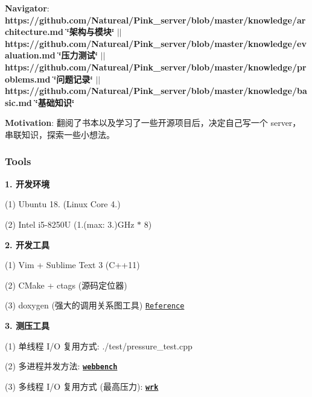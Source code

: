 {\bfseries Navigator}\+: {\bfseries https\+://github.com/\+Natureal/\+Pink\+\_\+server/blob/master/knowledge/architecture.\+md \char`\"{}架构与模块\char`\"{}} $\vert$$\vert$ {\bfseries https\+://github.com/\+Natureal/\+Pink\+\_\+server/blob/master/knowledge/evaluation.\+md \char`\"{}压力测试\char`\"{}} $\vert$$\vert$ {\bfseries https\+://github.com/\+Natureal/\+Pink\+\_\+server/blob/master/knowledge/problems.\+md \char`\"{}问题记录\char`\"{}} $\vert$$\vert$ {\bfseries https\+://github.com/\+Natureal/\+Pink\+\_\+server/blob/master/knowledge/basic.\+md \char`\"{}基础知识\char`\"{}}

{\bfseries Motivation}\+: 翻阅了书本以及学习了一些开源项目后，决定自己写一个 server，串联知识，探索一些小想法。 



\subsubsection*{Tools}


\begin{DoxyItemize}
\item {\bfseries 1. 开发环境}
\end{DoxyItemize}

(1) Ubuntu 18. (Linux Core 4.)

(2) Intel i5-\/8250U (1.(max\+: 3.)G\+Hz $\ast$ 8)


\begin{DoxyItemize}
\item {\bfseries 2. 开发工具}
\end{DoxyItemize}

(1) Vim + Sublime Text 3 (C++11)

(2) C\+Make + ctags (源码定位器)

(3) doxygen (强大的调用关系图工具) \href{https://blog.csdn.net/ZeroLiko/article/details/78162408}{\tt Reference}


\begin{DoxyItemize}
\item {\bfseries 3. 测压工具}
\end{DoxyItemize}

(1) 单线程 I/O 复用方式\+: ./test/pressure\+\_\+test.cpp

(2) 多进程并发方法\+: {\bfseries \href{http://home.tiscali.cz/~cz210552/webbench.html}{\tt webbench}}

(3) 多线程 I/O 复用方式 (最高压力)\+: {\bfseries \href{https://github.com/wg/wrk}{\tt wrk}} 



